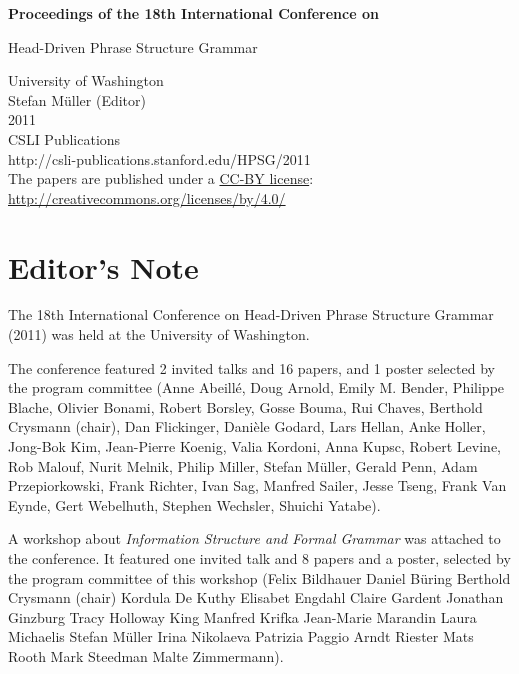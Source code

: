 \documentclass[11pt,a4paper,fleqn]{article}
\begin{document}
\begin{center}
{\Large
                {\bfseries Proceedings of the 18th International Conference on\par Head-Driven Phrase Structure Grammar\par}

                \vspace{8ex}

                     University of Washington\\[\baselineskip]

                        Stefan M{\"u}ller (Editor)\\[\baselineskip]

                                2011\\[\baselineskip]

                          CSLI Publications\\[\baselineskip]

              http://csli-publications.stanford.edu/HPSG/2011 \\[4\baselineskip]

The papers are published under a \href{http://creativecommons.org/licenses/by/4.0/}{CC-BY license}:\\[3pt]
\href{http://creativecommons.org/licenses/by/4.0/}{http://creativecommons.org/licenses/by/4.0/}
}
\end{center}
\newpage
\tableofcontents

\newpage

\section{Editor's Note}
The 18th International Conference on Head-Driven Phrase Structure Grammar (2011) was held at the University of Washington.

The conference featured 2 invited talks and 16 papers, and 1 poster selected by the program committee (Anne Abeillé,
Doug Arnold,
Emily M. Bender,
Philippe Blache,
Olivier Bonami,
Robert Borsley,
Gosse Bouma,
Rui Chaves,
Berthold Crysmann (chair),
Dan Flickinger,
Danièle Godard,
Lars Hellan,
Anke Holler,
Jong-Bok Kim,
Jean-Pierre Koenig,
Valia Kordoni,
Anna Kupsc,
Robert Levine,
Rob Malouf,
Nurit Melnik,
Philip Miller,
Stefan Müller,
Gerald Penn,
Adam Przepiorkowski,
Frank Richter,
Ivan Sag,
Manfred Sailer,
Jesse Tseng,
Frank Van Eynde,
Gert Webelhuth,
Stephen Wechsler,
Shuichi Yatabe).

A workshop about \emph{Information Structure and Formal Grammar}
was attached to the conference. It featured one invited talk and 8 papers and a poster, selected by the program
committee of this workshop (Felix Bildhauer
Daniel Büring
Berthold Crysmann (chair)
Kordula De Kuthy
Elisabet Engdahl
Claire Gardent
Jonathan Ginzburg
Tracy Holloway King
Manfred Krifka
Jean-Marie Marandin
Laura Michaelis
Stefan Müller
Irina Nikolaeva
Patrizia Paggio
Arndt Riester
Mats Rooth
Mark Steedman
Malte Zimmermann).
\end{document}
